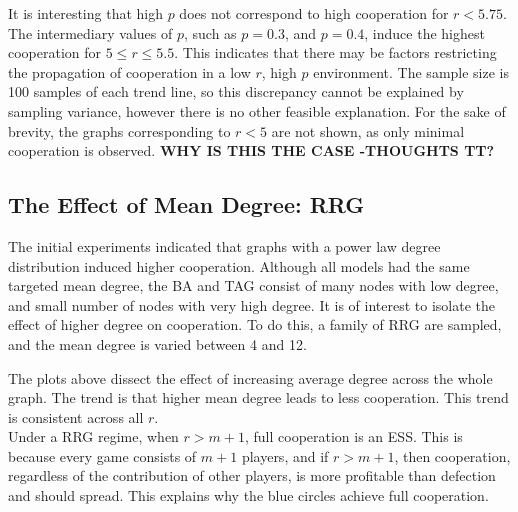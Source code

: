 It is interesting that high $p$ does not correspond to high cooperation for $r<5.75$. The intermediary values of $p$, such as $p=0.3$, and $p=0.4$, induce the highest cooperation for $5\leq r \leq 5.5$. This indicates that there may be factors restricting the propagation of cooperation in a low $r$, high $p$ environment. The sample size is 100 samples of each trend line, so this discrepancy cannot be explained by sampling variance, however there is no other feasible explanation. For the sake of brevity, the graphs corresponding to $r<5$ are not shown, as only minimal cooperation is observed. \textbf{WHY IS THIS THE CASE -THOUGHTS TT?} 


\subsection{The Effect of Mean Degree: RRG}
The initial experiments indicated that graphs with a power law degree distribution induced higher cooperation. Although all models had the same targeted mean degree, the BA and TAG consist of many nodes with low degree, and  small number of nodes with very high degree. It is of interest to isolate the effect of higher degree on cooperation. To do this, a family of RRG are sampled, and the mean degree is varied between 4 and 12. \\

 \FloatBarrier

 \FloatBarrier


The plots above dissect the effect of increasing average degree across the whole graph. The trend is that higher mean degree leads to less cooperation. This trend is consistent across all $r$. \\

Under a RRG regime, when $r>m+1$, full cooperation is an ESS. This is because every game consists of $m+1$ players, and if $r>m+1$, then cooperation, regardless of the contribution of other players, is more profitable than defection and should spread. This explains why the blue circles achieve full cooperation. \\

